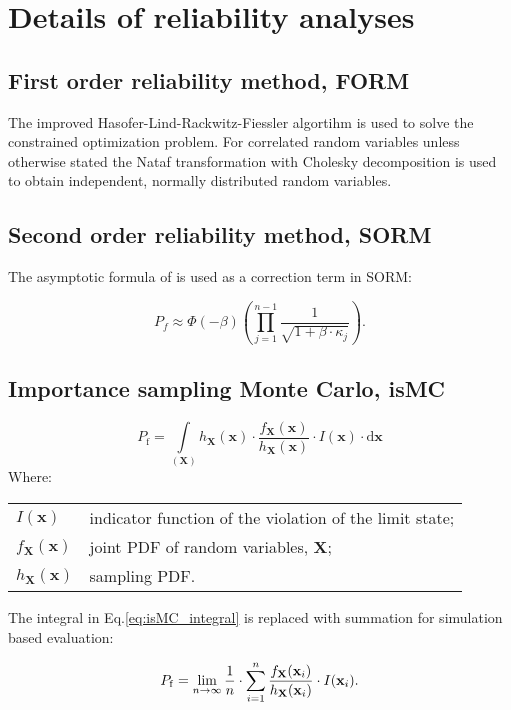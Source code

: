 
\chapter{Details of reliability analyses}
\label{ap:reli_details}

\section{First order reliability method, FORM}

The improved Hasofer-Lind-Rackwitz-Fiessler algortihm \citep{Rackwitz1979, Zhang1995a} is used to solve the constrained optimization problem. For correlated random variables unless otherwise stated the Nataf transformation \citep{Liu1986} with Cholesky decomposition is used to obtain independent, normally distributed random variables.

\section{Second order reliability method, SORM}

The asymptotic formula of \citet{Breitung1984} is used as a correction term in SORM:

\begin{equation}
	{P_f} \approx \Phi ( - \beta )\left( {\prod\limits_{j = 1}^{n - 1} {\frac{1}{{\sqrt {1 + \beta  \cdot {\kappa _j}} }}} } \right).
\end{equation}


\section{Importance sampling Monte Carlo, isMC}

\begin{equation}
\label{eq:isMC_integral}
	{P_\mathrm{f}} = \int\limits_{({\mathbf{X}})} {{h_{\mathbf{X}}}({\mathbf{x}}) \cdot \frac{{{f_{\mathbf{X}}}({\mathbf{x}})}}{{{h_{\mathbf{X}}}({\mathbf{x}})}} \cdot I({\mathbf{x}})}  \cdot \mathrm{d}{\mathbf{x}}
\end{equation}
Where:

\begin{tabular}{ll}
	$I(\mathbf{x})$ & indicator function of the violation of the limit state; \\
	$f_{\mathbf{X}}({\mathbf{x}})$ & joint PDF of random variables, $\mathbf{X}$; \\
	$h_{\mathbf{X}}({\mathbf{x}})$ & sampling PDF.
\end{tabular}

\noindent
The integral in Eq.\ref{eq:isMC_integral} is replaced with summation for simulation based evaluation:

\begin{equation}
\label{eq:isMC_sum}
	{P_\mathrm{f}} = \mathop {\lim }\limits_{n \to \infty } \frac{1}{n} \cdot \sum\limits_{i = 1}^n {\frac{{{f_{\bf{X}}}({{\bf{x}}_i})}}{{{h_{\bf{X}}}({{\bf{x}}_i})}} \cdot I({{\bf{x}}_i})}. 
\end{equation}

